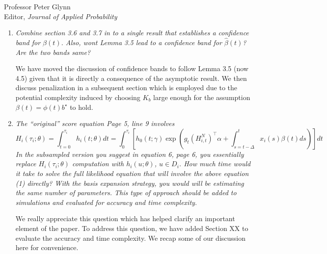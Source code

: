 \documentclass[11pt]{letter} %
\begin{document}
\begin{letter}{Professor
	Peter Glynn\\
	Editor, {\em Journal of Applied Probability}}
\begin{enumerate}
\item {\it Combine section 3.6 and 3.7 in to a single result that establishes a confidence band for $\beta (t)$. Also, wont Lemma 3.5 lead to a confidence band for $\hat \beta (t)$? Are the two bands same?}

\vspace{5mm}
We have moved the discussion of confidence bands to follow Lemma 3.5 (now 4.5) given that it is directly a consequence of the asymptotic result.  We then  discuss penalization in a subsequent section which is employed due to the potential complexity induced by choosing $K_b$ large enough for the assumption $\beta (t) =\phi (t) b^\star$ to hold.
\vspace{5mm}

\item {\it The ``original'' score equation Page 5, line 9 involves
$$
H_i (\tau_i ;\theta) = \int_{t=0}^{\tau_i} h_i (t; \theta)dt = \int_0^{\tau_i} \left[ h_0 (t;\gamma) \exp \left( g_t (H_{i,t}^N)^\top \alpha + \int_{s=t-\Delta}^t x_i (s) \beta(t) ds \right) \right] dt
$$
In the subsampled version you suggest in equation 6, page 6, you essentially replace $H_i (\tau_i; \theta)$ computation with $h_i (u; \theta)$, $u \in D_i$. How much time would it take to solve the full likelihood equation that will involve the above equation (1) directly? With the basis expansion strategy, you
would will be estimating the same number of parameters. This type of approach should be added to simulations and evaluated for accuracy and time complexity.}

\vspace{5mm}
We really appreciate this question which has helped clarify an important element of the paper.  To address this question, we have added Section XX to evaluate the accuracy and time complexity.  We recap some of our discussion here for convenience.
\vspace{5mm}


\end{enumerate}
\end{letter}
\end{document}
